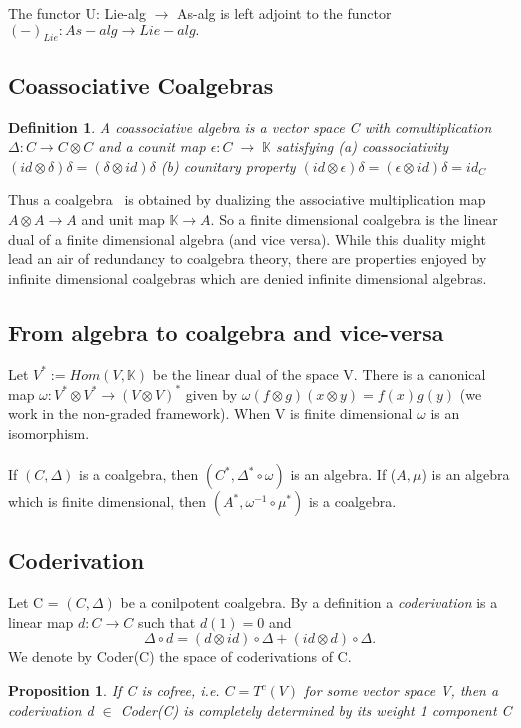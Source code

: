 \documentclass[preprint, 5p, 10pt]{elsarticle}
\theoremstyle{plain}
\newtheorem{proposition}[theorem]{Proposition}
\newtheorem{definition}[theorem]{Definition}
\begin{document}
 The functor U: Lie-alg $\rightarrow$ As-alg is left adjoint to the functor
 $(-)_{Lie}:As-alg \rightarrow Lie-alg.$

\subsection{Coassociative Coalgebras}
\begin{definition}
 A \textit{coassociative algebra} is a vector space C with comultiplication $\Delta:C \rightarrow C \otimes
C$ and a counit map $\epsilon:C\;\rightarrow\;\mathbb{K}$ satisfying 
(a) coassociativity $(id \otimes \delta)\delta = (\delta \otimes id)\delta$
(b) counitary property $(id \otimes \epsilon)\delta = (\epsilon \otimes id)\delta = id_{C}$
\end{definition}
Thus a coalgebra~\cite{CoalgebraRep, AlgebraicOperads} is obtained by dualizing the associative multiplication map $A \otimes A \rightarrow A$
and unit map $\mathbb{K} \rightarrow A.$ So a finite dimensional coalgebra is the linear dual of a finite
dimensional algebra (and vice versa). While this duality might lead an air of redundancy to coalgebra theory,
there are properties enjoyed by infinite dimensional coalgebras which are denied infinite dimensional algebras.
\subsection{From algebra to coalgebra and vice-versa}
Let $V^{*}:=Hom(V,\mathbb{K})$ be the linear dual of the space V. There is a canonical map
$\omega:V^{*} \otimes V^{*} \rightarrow (V \otimes V)^{*}$ given by $\omega(f \otimes g)(x \otimes y)=f(x)
g(y)$ (we work in the non-graded framework). When V is finite dimensional $\omega$ is an isomorphism.
\paragraph{}\phantom{kkk}If $(C,\Delta)$ is a coalgebra, then $(C^{*},\Delta^{*} \circ \omega)$ is an 
algebra. 
\phantom{kkk}If ($A,\mu$) is an algebra which is finite dimensional, then $(A^{*},\omega^{-1}\circ \mu^{*})$
is a coalgebra. 
\subsection{Coderivation}
Let C = $(C,\Delta)$ be a conilpotent coalgebra. By a definition a \textit{coderivation} is a linear map
$d:C \rightarrow C$ such that $d(1) = 0$ and 
\begin{displaymath}
 \Delta \circ d = (d \otimes id)\circ \Delta + (id \otimes d) \circ \Delta.
\end{displaymath}
We denote by Coder(C) the space of coderivations of C. 
\begin{proposition}
 If C is cofree, i.e. $C = T^{c}(V)$ for some vector space V, then a coderivation d $\in$ Coder(C)
is completely determined by its weight 1 component C 
\end{proposition}
\end{document}
